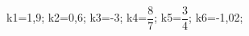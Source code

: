 \documentclass[exercice]{thedocument}%
\begin{document}
%
    \>k1=1,9;%
    \>k2=0,6;%
    \>k3=-3;%
    \>k4=$\dfrac87$;%
    \>k5=$\dfrac34$;%
    \>k6=-1,02;%
\end{document}
